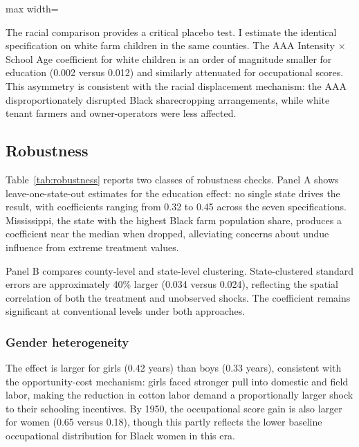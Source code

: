 \documentclass[12pt]{article}
\begin{document}
\begin{table}[H]
\caption{Racial Comparison: Black vs. White Farm Children}\label{tab:racial}
\begin{adjustbox}{max width=\textwidth}

\end{adjustbox}
\end{table}

The racial comparison provides a critical placebo test. I estimate the identical specification on white farm children in the same counties. The AAA Intensity $\times$ School Age coefficient for white children is an order of magnitude smaller for education (0.002 versus 0.012) and similarly attenuated for occupational scores. This asymmetry is consistent with the racial displacement mechanism: the AAA disproportionately disrupted Black sharecropping arrangements, while white tenant farmers and owner-operators were less affected.

\subsection{Robustness}



Table~\ref{tab:robustness} reports two classes of robustness checks. Panel A shows leave-one-state-out estimates for the education effect: no single state drives the result, with coefficients ranging from 0.32 to 0.45 across the seven specifications. Mississippi, the state with the highest Black farm population share, produces a coefficient near the median when dropped, alleviating concerns about undue influence from extreme treatment values.

Panel B compares county-level and state-level clustering. State-clustered standard errors are approximately 40\% larger (0.034 versus 0.024), reflecting the spatial correlation of both the treatment and unobserved shocks. The coefficient remains significant at conventional levels under both approaches.

\subsubsection*{Gender heterogeneity} The effect is larger for girls (0.42 years) than boys (0.33 years), consistent with the opportunity-cost mechanism: girls faced stronger pull into domestic and field labor, making the reduction in cotton labor demand a proportionally larger shock to their schooling incentives. By 1950, the occupational score gain is also larger for women (0.65 versus 0.18), though this partly reflects the lower baseline occupational distribution for Black women in this era.
\end{document}

